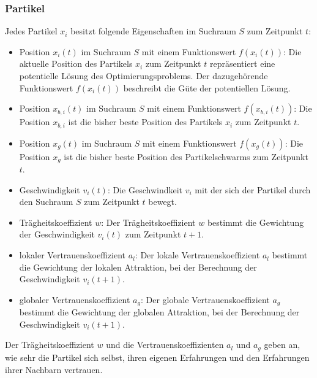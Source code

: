 \documentclass[a4paper, 11pt]{article}
\begin{document}
\subsubsection{Partikel}
Jedes Partikel $x_{i}$ besitzt folgende Eigenschaften im Suchraum $S$ zum Zeitpunkt $t$:
\begin{itemize}
	\item Position $x_{i}(t)$ im Suchraum $S$ mit einem Funktionswert $f(x_{i}(t))$: Die aktuelle Position des Partikels $x_{i}$ zum Zeitpunkt $t$ repräsentiert eine potentielle Lösung des Optimierungsproblems. Der dazugehörende Funktionswert $f(x_{i}(t))$ beschreibt die Güte der potentiellen Lösung.
	\item Position $x_{b,i}(t)$ im Suchraum $S$ mit einem Funktionswert $f(x_{b,i}(t))$: Die Position $x_{b,i}$ ist die bisher beste Position des Partikels $x_{i}$ zum Zeitpunkt $t$.
	\item Position $x_{g}(t)$ im Suchraum $S$ mit einem Funktionswert $f(x_{g}(t))$: Die Position $x_{g}$ ist die bisher beste Position des Partikelschwarms zum Zeitpunkt $t$.
	\item Geschwindigkeit $v_{i}(t)$: Die Geschwindkeit $v_{i}$ mit der sich der Partikel durch den Suchraum $S$ zum Zeitpunkt $t$ bewegt.
	\item Trägheitskoeffizient $w$: Der Trägheitskoeffizient $w$ bestimmt die Gewichtung der Geschwindigkeit $v_{i}(t)$ zum Zeitpunkt $t+1$.
	\item lokaler Vertrauenskoeffizient $a_{l}$: Der lokale Vertrauenskoeffizient $a_{l}$ bestimmt die Gewichtung der lokalen Attraktion, bei der Berechnung der Geschwindigkeit $v_{i}(t+1)$.
	\item globaler Vertrauenskoeffizient $a_{g}$: Der globale Vertrauenskoeffizient $a_{g}$ bestimmt die Gewichtung der globalen Attraktion, bei der Berechnung der Geschwindigkeit $v_{i}(t+1)$.
\end{itemize}
Der Trägheitskoeffizient $w$ und die Vertrauenskoeffizienten $a_{l}$ und $a_{g}$ geben an, wie sehr die Partikel sich selbst, ihren eigenen Erfahrungen und den Erfahrungen ihrer Nachbarn vertrauen.
\newpage
\end{document}
